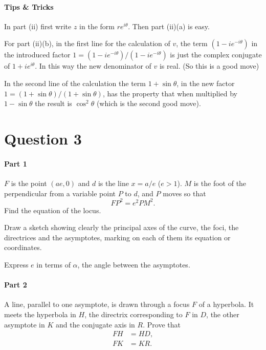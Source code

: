\documentclass[11pt,a4paper]{report}
\theoremstyle{plain}
\theoremstyle{definition}
\begin{document}
\bigskip

\paragraph{Tips \& Tricks} In part (ii)   first write $ z $ in the form $ re^{i\theta} $.  Then part (ii)(a) is easy.

\medskip
For part (ii)(b), in the first line for the calculation of $ v $, the term   $ (1-i e^{-i\theta})$ in the introduced factor $ 1 = (1-i e^{-i\theta})/(1-i e^{-i\theta}) $ is just the complex conjugate of $  1+i e^{i\theta}$. In this way the new denominator of $ v $ is real. (So this is a good move)

In the second line of the calculation the term $ 1+ \sin \theta $, in the new factor $ 1 = (1+\sin \theta)/(1+\sin \theta) $, has the property that when multiplied by $ 1-\sin\theta $ the result is $ \cos^2 \theta $ (which is the second good move).


\newpage
\section*{Question 3}

\paragraph{Part 1} $ F $ is the point $ (ae,0) $ and $ d $ is the line $ x =a/e $ ($ e> 1 $).  $ M $ is the foot of the perpendicular from a variable point $ P $ to $ d $, and $ P $ moves so that 
\[
FP^2 = e^2 PM^2 .
\]
Find the equation of the locus.

Draw a sketch showing clearly the principal axes of the curve, the foci, the directrices and the asymptotes, marking on each of them its equation or coordinates.

Express $ e $ in terms of $ \alpha $, the angle between the asymptotes. 

\paragraph{Part 2}
A line, parallel to one asymptote, is drawn through a focus $ F $ of a hyperbola.  It meets the hyperbola in $ H $, the directrix corresponding to $ F $ in $ D   $, the other asymptote in $ K $ and the conjugate axis in $ R $.  Prove that
\begin{align*}
FH &= HD, \\  FK &= KR.
\end{align*}  
\end{document}
